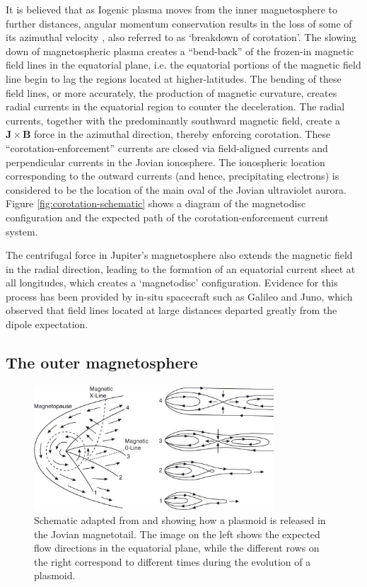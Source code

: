 It is believed that as Iogenic plasma moves from the inner magnetosphere to further distances, angular momentum conservation results in the loss of some of its azimuthal velocity \cite{Cowley2001a,Hill2001,Southwood2001a}, also referred to as `breakdown of corotation'. The slowing down of magnetospheric plasma creates a ``bend-back'' of the frozen-in magnetic field lines in the equatorial plane, i.e. the equatorial portions of the magnetic field line begin to lag the regions located at higher-latitudes. The bending of these field lines, or more accurately, the production of magnetic curvature, creates radial currents in the equatorial region to counter the deceleration. The radial currents, together with the predominantly southward magnetic field, create a $\mathbf{J}\times\mathbf{B}$ force in the azimuthal direction, thereby enforcing corotation. These ``corotation-enforcement'' currents are closed via field-aligned currents and perpendicular currents in the Jovian ionosphere. The ionospheric location corresponding to the outward currents (and hence, precipitating electrons) is considered to be the location of the main oval of the Jovian ultraviolet aurora. Figure \ref{fig:corotation-schematic} shows a diagram of the magnetodisc configuration and the expected path of the corotation-enforcement current system.

The centrifugal force in Jupiter's magnetosphere also extends the magnetic field in the radial direction, leading to the formation of an equatorial current sheet at all longitudes, which creates a `magnetodisc' configuration. Evidence for this process has been provided by in-situ spacecraft such as Galileo and Juno, which observed that field lines located at large distances departed greatly from the dipole expectation. 

\subsection{The outer magnetosphere}

\begin{figure}
    \centering
    \includegraphics[width=0.8\textwidth]{images1/chp1-vasyliunas-cycle.jpg}
    \caption{Schematic adapted from \protect{} and \protect{} showing how a plasmoid is released in the Jovian magnetotail. The image on the left shows the expected flow directions in the equatorial plane, while the different rows on the right correspond to different times during the evolution of a plasmoid.}
    \label{fig:vasyliunas-cycle}
\end{figure}

